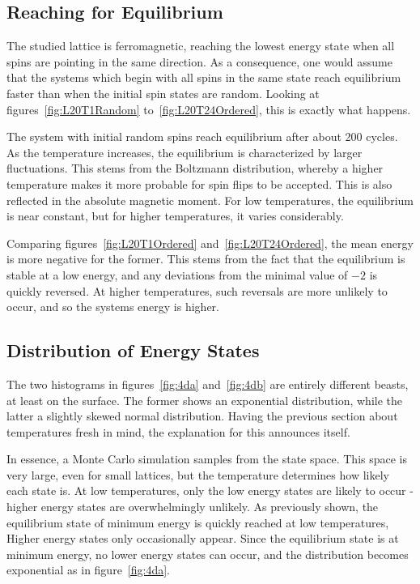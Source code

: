 \documentclass[aps,reprint]{revtex4-1}
\begin{document}
\subsection{Reaching for Equilibrium}
\label{sec:reaching-equilibrium-2}

The studied lattice is ferromagnetic, reaching the lowest energy state when all
spins are pointing in the same direction. As a consequence, one would assume
that the systems which begin with all spins in the same state reach equilibrium
faster than when the initial spin states are random. Looking at
figures~\ref{fig:L20T1Random} to~\ref{fig:L20T24Ordered},
this is exactly what happens.

The system with initial random spins reach equilibrium after about 200 cycles.
As the temperature increases, the equilibrium is characterized by larger
fluctuations. This stems from the Boltzmann distribution, whereby a higher
temperature makes it more probable for spin flips to be accepted. This is also
reflected in the absolute magnetic moment. For low temperatures, the equilibrium
is near constant, but for higher temperatures, it varies considerably.

Comparing figures~\ref{fig:L20T1Ordered} and~\ref{fig:L20T24Ordered}, the mean
energy is more negative for the former. This stems from the fact that the
equilibrium is stable at a low energy, and any deviations from the minimal value
of \(-2\) is quickly reversed. At higher temperatures, such reversals are more
unlikely to occur, and so the systems energy is higher.


\subsection{Distribution of Energy States}
\label{sec:distr-energy-stat-2}

The two histograms in figures~\ref{fig:4da}
and~\ref{fig:4db} are entirely different beasts, at least on the surface. The
former shows an exponential distribution, while the latter a slightly skewed
normal distribution. Having the previous section about temperatures fresh in
mind, the explanation for this announces itself.

In essence, a Monte Carlo simulation samples from the state space. This space is
very large, even for small lattices, but the temperature determines how likely
each state is. At low temperatures, only the low energy states are likely to
occur - higher energy states are overwhelmingly unlikely. As previously shown,
the equilibrium state of minimum energy is quickly reached at low temperatures,
Higher energy states only occasionally appear. Since the equilibrium state is at
minimum energy, no lower energy states can occur, and the distribution becomes
exponential as in figure~\ref{fig:4da}.
\end{document}

